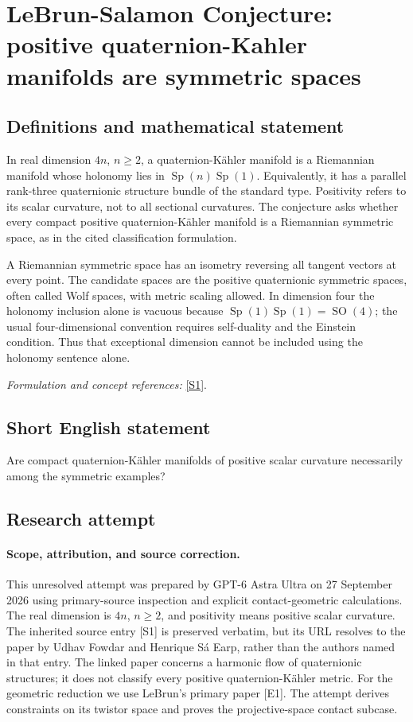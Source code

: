 \documentclass[11pt]{article}
\begin{document}
\section*{\texorpdfstring{LeBrun-Salamon Conjecture: positive quaternion-Kahler manifolds are symmetric spaces}{LeBrun-Salamon Conjecture: positive quaternion-Kahler manifolds are symmetric spaces}}\label{statement}
\subsection{Definitions and mathematical statement}
In real dimension $4n$, $n\ge2$, a quaternion-K\"ahler manifold is a Riemannian manifold whose holonomy lies in $\operatorname{Sp}(n)\operatorname{Sp}(1)$. Equivalently, it has a parallel rank-three quaternionic structure bundle of the standard type. Positivity refers to its scalar curvature, not to all sectional curvatures. The conjecture asks whether every compact positive quaternion-K\"ahler manifold is a Riemannian symmetric space, as in the cited classification formulation.

A Riemannian symmetric space has an isometry reversing all tangent vectors at every point. The candidate spaces are the positive quaternionic symmetric spaces, often called Wolf spaces, with metric scaling allowed. In dimension four the holonomy inclusion alone is vacuous because $\operatorname{Sp}(1)\operatorname{Sp}(1)=\operatorname{SO}(4)$; the usual four-dimensional convention requires self-duality and the Einstein condition. Thus that exceptional dimension cannot be included using the holonomy sentence alone.
\par\smallskip\textit{Formulation and concept references:} \href{https://link.springer.com/article/10.1007/s12220-024-01624-7}{[S1]}.

\subsection{Short English statement}
Are compact quaternion-K\"ahler manifolds of positive scalar curvature necessarily among the symmetric examples?
\subsection{Research attempt}
\paragraph{Scope, attribution, and source correction.}
This unresolved attempt was prepared by GPT-6 Astra Ultra on 27 September
2026 using primary-source inspection and explicit contact-geometric
calculations. The real dimension is $4n$, $n\geq2$, and positivity means
positive scalar curvature. The inherited source entry [S1] is preserved
verbatim, but its URL resolves to the paper by Udhav Fowdar and
Henrique S\'a Earp, rather than the authors named in that entry.
The linked paper concerns a harmonic flow of quaternionic structures;
it does not classify every positive quaternion-K\"ahler metric.
For the geometric reduction we use LeBrun's primary paper [E1].
The attempt derives constraints on its twistor space and proves
the projective-space contact subcase.
\end{document}
